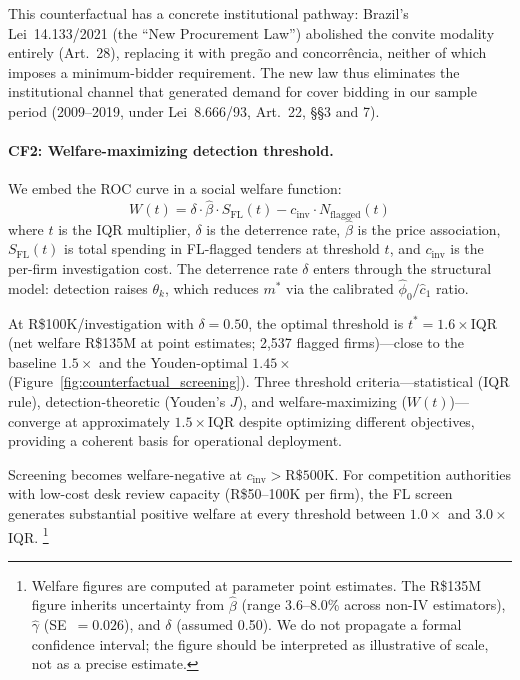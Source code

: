 This counterfactual has a concrete institutional pathway:
Brazil's Lei~14.133/2021 (the ``New Procurement Law'') abolished the
convite modality entirely (Art.~28), replacing it with preg\~ao and
concorr\^encia, neither of which imposes a minimum-bidder
requirement. The new law thus eliminates the institutional channel
that generated demand for cover bidding in our sample period
(2009--2019, under Lei~8.666/93, Art.~22, \S\S3 and 7).

\paragraph{CF2: Welfare-maximizing detection threshold.}
We embed the ROC curve in a social welfare function:
\begin{equation}
  W(t) = \delta \cdot \hat{\beta} \cdot S_{\text{FL}}(t) -
  c_{\text{inv}} \cdot N_{\text{flagged}}(t)
  \label{eq:welfare_function}
\end{equation}
where $t$ is the IQR multiplier, $\delta$ is the deterrence rate,
$\hat{\beta}$ is the price association, $S_{\text{FL}}(t)$ is total
spending in FL-flagged tenders at threshold $t$, and $c_{\text{inv}}$
is the per-firm investigation cost. The deterrence rate $\delta$
enters through the structural model: detection raises $\theta_k$,
which reduces $m^*$ via the calibrated $\hat{\phi}_0 / \hat{c}_1$
ratio.

At R\$100K/investigation with $\delta = 0.50$, the optimal
threshold is $t^* = 1.6\times$IQR (net welfare R\$135M at point
estimates; 2,537 flagged firms)---close to the baseline
$1.5\times$ and the Youden-optimal $1.45\times$
(Figure~\ref{fig:counterfactual_screening}). Three threshold criteria---statistical (IQR rule),
detection-theoretic (Youden's $J$), and welfare-maximizing
($W(t)$)---converge at approximately $1.5\times$IQR despite
optimizing different objectives, providing a coherent basis for
operational deployment.

Screening becomes welfare-negative at $c_{\text{inv}} >
\text{R\$500K}$. For competition authorities with low-cost desk
review capacity (R\$50--100K per firm), the FL screen generates
substantial positive welfare at every threshold between
$1.0\times$ and $3.0\times$IQR.%
\footnote{Welfare figures are computed at parameter point estimates.
The R\$135M figure inherits uncertainty from $\hat{\beta}$ (range
3.6--8.0\% across non-IV estimators), $\hat{\gamma}$ (SE~$= 0.026$),
and $\delta$ (assumed 0.50). We do not propagate a formal confidence
interval; the figure should be interpreted as illustrative of scale,
not as a precise estimate.}

